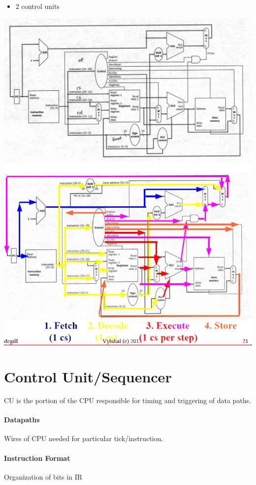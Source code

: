 \documentclass[12 pt]{article}
\begin{document}
\begin{itemize}
\item 2 control units
\end{itemize}
\includegraphics[scale=0.2]{slp3}
\\ \includegraphics[scale=0.7]{psm}
	
	\section{Control Unit/Sequencer}
	CU is the portion of the CPU responsible for timing and triggering of data paths.
	\paragraph{Datapaths} Wires of CPU needed for particular tick/instruction.
	\paragraph{Instruction Format} Organization of bits in IR
\end{document}
